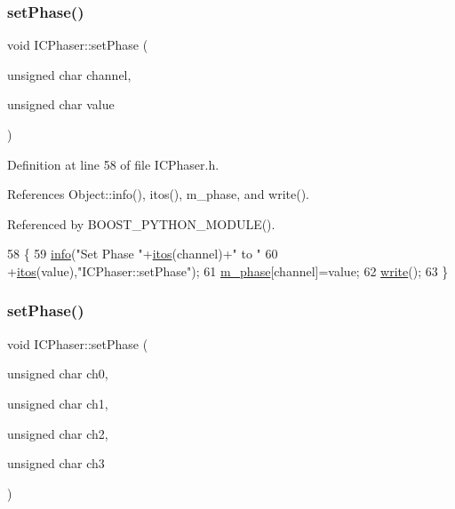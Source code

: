 \subsubsection{\texorpdfstring{set\+Phase()}{setPhase()}\hspace{0.1cm}{\footnotesize\ttfamily [1/2]}}
{\footnotesize\ttfamily void I\+C\+Phaser\+::set\+Phase (\begin{DoxyParamCaption}\item[{unsigned char}]{channel,  }\item[{unsigned char}]{value }\end{DoxyParamCaption})\hspace{0.3cm}{\ttfamily [inline]}}



Definition at line 58 of file I\+C\+Phaser.\+h.



References Object\+::info(), itos(), m\+\_\+phase, and write().



Referenced by B\+O\+O\+S\+T\+\_\+\+P\+Y\+T\+H\+O\+N\+\_\+\+M\+O\+D\+U\+L\+E().


\begin{DoxyCode}
58                                                            \{
59     \hyperlink{classObject_a644fd329ea4cb85f54fa6846484b84a8}{info}(\textcolor{stringliteral}{"Set Phase "}+\hyperlink{Tools_8h_af330027dbdafb9a30768b3613c553e60}{itos}(channel)+\textcolor{stringliteral}{" to "}
60      +\hyperlink{Tools_8h_af330027dbdafb9a30768b3613c553e60}{itos}(value),\textcolor{stringliteral}{"ICPhaser::setPhase"});
61     \hyperlink{classICPhaser_afe2a4527d58d08342d631dfa7c731203}{m\_phase}[channel]=value;
62     \hyperlink{classICPhaser_a160d0f9b959c865fc3458857bb303dd0}{write}();
63   \}
\end{DoxyCode}
\mbox{\label{classICPhaser_a7bb639e8a7bd98c20b29c9fc3b4ffcce}} 
\subsubsection{\texorpdfstring{set\+Phase()}{setPhase()}\hspace{0.1cm}{\footnotesize\ttfamily [2/2]}}
{\footnotesize\ttfamily void I\+C\+Phaser\+::set\+Phase (\begin{DoxyParamCaption}\item[{unsigned char}]{ch0,  }\item[{unsigned char}]{ch1,  }\item[{unsigned char}]{ch2,  }\item[{unsigned char}]{ch3 }\end{DoxyParamCaption})\hspace{0.3cm}{\ttfamily [inline]}}




